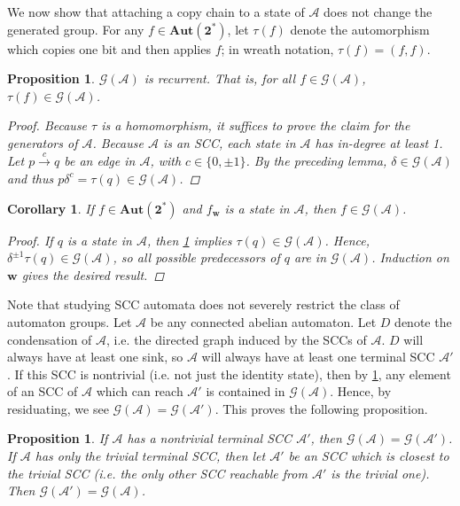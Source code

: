 \documentclass[12pt, letterpaper]{article}
\newcommand{\bin}{\mathbf 2}
\newcommand{\A}{\mathcal A}
\newcommand{\ch}[1]{\mathbf{#1}}
\newcommand{\res}[2]{{{#1}_{\ch{#2}}}}
\newcommand{\Aut}{\mathbf{Aut}}
\newcommand{\gp}{\mathcal G}
\newtheorem{cor}[thm]{Corollary}
\newtheorem{prop}[thm]{Proposition}
\begin{document}
We now show that attaching a copy chain to a state of $\A$ does not change the
generated group.  For any $f \in \Aut(\bin^*)$, let $\tau(f)$ denote the
automorphism which copies one bit and then applies $f$; in wreath notation,
$\tau(f) = (f, f)$.
\begin{prop}\label{prop:recurrent}
    $\gp(\A)$ is recurrent. That is, for all $f \in \gp(\A)$,
    $\tau(f) \in \gp(\A)$.
    \begin{proof}
        Because $\tau$ is a homomorphism, it suffices to prove the claim for
        the generators of $\A$. Because $\A$ is an SCC, each state in $\A$ has
        in-degree at least 1. Let $p \xrightarrow{c} q$ be an edge in $\A$,
        with $c \in \{0, \pm 1\}$. By the preceding lemma, $\delta \in \gp(\A)$
        and thus $p \delta^c = \tau(q) \in \gp(\A)$.
    \end{proof}
\end{prop}

\begin{cor}\label{cor:back-residuals}
    If $f \in \Aut(\bin^*)$ and $\res{f}{w}$ is a state in $\A$, then
    $f \in \gp(\A)$.
    \begin{proof}
        If $q$ is a state in $\A$, then \cref{prop:recurrent} implies
        $\tau(q) \in \gp(\A)$. Hence, $\delta^{\pm 1} \tau(q) \in \gp(\A)$,
        so all possible predecessors of $q$ are in $\gp(\A)$. Induction
        on $\ch{w}$ gives the desired result.
    \end{proof}
\end{cor}

Note that studying SCC automata does not severely restrict the class of
automaton groups. Let $\A$ be any connected abelian automaton. Let $D$ denote
the condensation of $\A$, i.e. the directed graph induced by the SCCs of $\A$.
$D$ will always have at least one sink, so $\A$ will always have at least one
terminal SCC $\A'$. If this SCC is nontrivial (i.e. not just the identity
state), then by \cref{cor:back-residuals}, any element of an SCC of $\A$ which
can reach $\A'$ is contained in $\gp(\A)$. Hence, by residuating, we see
$\gp(\A) = \gp(\A')$. This proves the following proposition.
\begin{prop}\label{prop:generated-by-terminal}
    If $\A$ has a nontrivial terminal SCC $\A'$, then $\gp(\A) = \gp(\A')$.
    If $\A$ has only the trivial terminal SCC, then let $\A'$ be an SCC
    which is closest to the trivial SCC (i.e. the only other SCC reachable from
    $\A'$ is the trivial one). Then $\gp(\A') = \gp(\A)$.
\end{prop}
\end{document}
